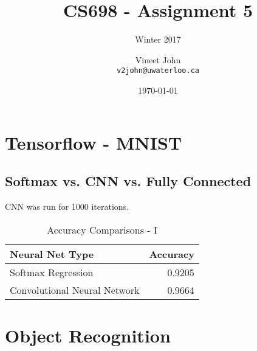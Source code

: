\documentclass[parskip=half]{scrartcl}
\begin{document}
\title{CS698 - Assignment 5}
\subtitle{Winter 2017}
\author{
    Vineet John\\
    \texttt{v2john@uwaterloo.ca}
}
\date{\today}
\maketitle


\section{Tensorflow - MNIST} %
\label{sec:tensorflow_mnist}

    \subsection{Softmax vs. CNN vs. Fully Connected} %
    \label{sub:softmax_vs_cnn_vs_fully_connected}

        CNN was run for 1000 iterations.

        \begin{table}[th]
            \centering
            \begin{tabular}{| l | r |}
            \hline
            \textbf{Neural Net Type} & \textbf{Accuracy} \\
            \hline
                \hline
                Softmax Regression & 0.9205 \\
                \hline
                Convolutional Neural Network & 0.9664 \\
            \hline
            \end{tabular}
            \caption{Accuracy Comparisons - I}
            \label{tab:accuracy_comparisons_i}
        \end{table}
    



\section{Object Recognition} %
\label{sec:object_recognition}

\end{document}
